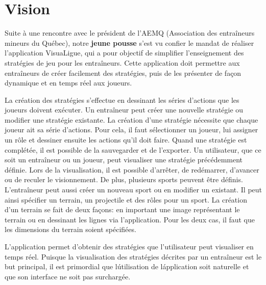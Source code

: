
\chapter{Vision}
\label{s:vision}

Suite à une rencontre avec le président de l'AEMQ (Association des entraîneurs mineurs du Québec), notre \textbf{jeune pousse} s'est vu confier le mandat de réaliser l'application VisuaLigue, qui a pour objectif de simplifier l'enseignement des stratégies de jeu pour les entraîneurs.
Cette application doit permettre aux entraîneurs de créer facilement des stratégies, puis de les présenter de façon dynamique et en temps réel aux joueurs.

La cr\'eation des strat\'egies s'effectue en dessinant les s\'eries d'actions que les joueurs doivent ex\'ecuter.
Un entraîneur peut créer une nouvelle stratégie ou modifier une stratégie existante.
La création d'une stratégie nécessite que chaque joueur ait sa série d'actions.
Pour cela, il faut s\'electionner un joueur, lui assigner un r\^ole et dessiner ensuite les actions qu'il doit faire.
Quand une strat\'egie est compl\'et\'ee, il est possible de la sauvegarder et de l'exporter.
Un utilisateur, que ce soit un entraîneur ou un joueur, peut visualiser une strat\'egie pr\'ec\'edemment d\'efinie.
Lors de la visualisation, il est possible d'arr\^eter, de red\'emarrer, d'avancer ou de reculer le visionnement.
De plus, plusieurs sports peuvent \^etre d\'efinis.
L'entraîneur peut aussi créer un nouveau sport ou en modifier un existant.
Il peut ainsi sp\'ecifier un terrain, un projectile et des r\^oles pour un sport.
La création d'un terrain se fait de deux façons: en important une image représentant le terrain ou en dessinant les lignes via l'application.
Pour les deux cas, il faut que les dimensions du terrain soient spécifiées.

L'application permet d'obtenir des strat\'egies que l'utilisateur peut visualiser en temps r\'eel.
Puisque la visualisation des stratégies décrites par un entraîneur est le but principal, il est primordial que l\'utilisation de l\'application soit naturelle et que son interface ne soit pas surchargée.
